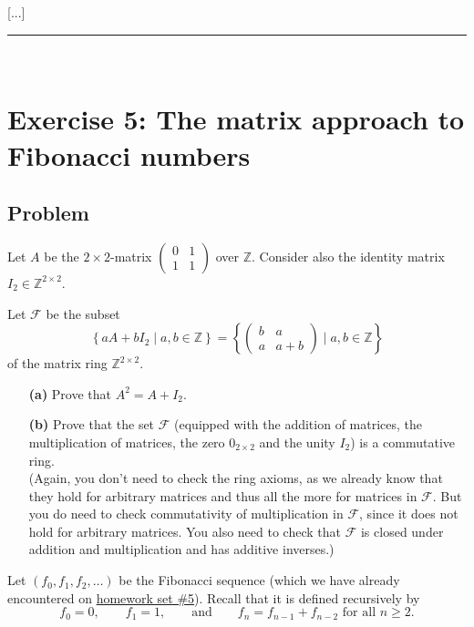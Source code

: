\documentclass[paper=a4, fontsize=12pt]{scrartcl} %
\newcommand{\ZZ}{\mathbb{Z}} %
\newcommand{\set}[1]{\left\{ #1 \right\}}
\newcommand{\tup}[1]{\left( #1 \right)}
\newcommand{\calF}{\mathcal{F}}
\newcommand{\horrule}[1]{\rule{\linewidth}{#1}} %
\theoremstyle{plainsl}
\theoremstyle{definition}
\theoremstyle{remark}
\begin{document}
[...]

\horrule{0.3pt} \\[0.4cm]

\section{Exercise 5: The matrix approach to Fibonacci numbers}

\subsection{Problem}

Let $A$ be the $2 \times 2$-matrix
$\begin{pmatrix}
  0 & 1 \\
  1 & 1
 \end{pmatrix}$
over $\ZZ$.
Consider also the identity matrix $I_2 \in \ZZ^{2 \times 2}$.

Let $\calF$ %
be the subset
\[
 \set{ aA + bI_2 \mid a, b \in \ZZ }
 =
 \set{ \begin{pmatrix} b & a \\ a & a+b \end{pmatrix} \mid a, b \in \ZZ }
\]
of the matrix ring $\ZZ^{2 \times 2}$.

\begin{enumerate}

\item[\textbf{(a)}]
Prove that $A^2 = A + I_2$.

\item[\textbf{(b)}]
Prove that the set $\calF$ (equipped with the addition of matrices,
the multiplication of matrices, the zero $0_{2 \times 2}$ and
the unity $I_2$) is a commutative ring. \\
(Again, you don't need to check the ring axioms, as we already
know that they hold for arbitrary matrices and thus all the more
for matrices in $\calF$.
But you do need to check commutativity of multiplication in
$\calF$, since it does not hold for arbitrary matrices.
You also need to check that $\calF$ is closed under addition
and multiplication and has additive inverses.)

\end{enumerate}

Let $\tup{f_0, f_1, f_2, \ldots}$ be the Fibonacci sequence (which
we have already encountered on
\href{http://www.cip.ifi.lmu.de/~grinberg/t/19s/hw5s.pdf}{homework set \#5}).
Recall that it is defined recursively by
\[
f_0 = 0, \qquad
f_1 = 1, \qquad \text{and} \qquad
f_n = f_{n-1} + f_{n-2} \text{ for all } n \geq 2 .
\]
\end{document}
